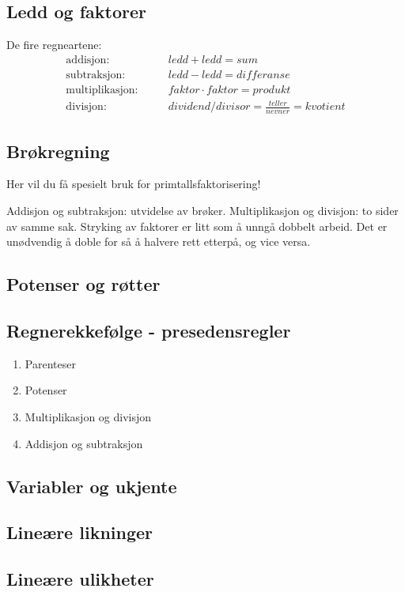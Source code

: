 \subsection{Ledd og faktorer} 
De fire regneartene:
\begin{align*}
    \text{addisjon: }& &&ledd + ledd = sum \\
    \text{subtraksjon: }& &&ledd - ledd = differanse \\
    \text{multiplikasjon: }& &&faktor \cdot faktor = produkt \\
    \text{divisjon: }& &&dividend / divisor = \frac{teller}{nevner} = kvotient
\end{align*}
\subsection{Brøkregning}
Her vil du få spesielt bruk for primtallsfaktorisering!

Addisjon og subtraksjon: utvidelse av brøker.
Multiplikasjon og divisjon: to sider av samme sak.
Stryking av faktorer er litt som å unngå dobbelt arbeid. Det er unødvendig å doble for så å halvere rett etterpå, og vice versa.

\subsection{Potenser og røtter}
\subsection{Regnerekkefølge - presedensregler} 
\begin{enumerate}
    \item Parenteser
    \item Potenser
    \item Multiplikasjon og divisjon
    \item Addisjon og subtraksjon
\end{enumerate}
\subsection{Variabler og ukjente} 
\subsection{Lineære likninger} 
\subsection{Lineære ulikheter}

